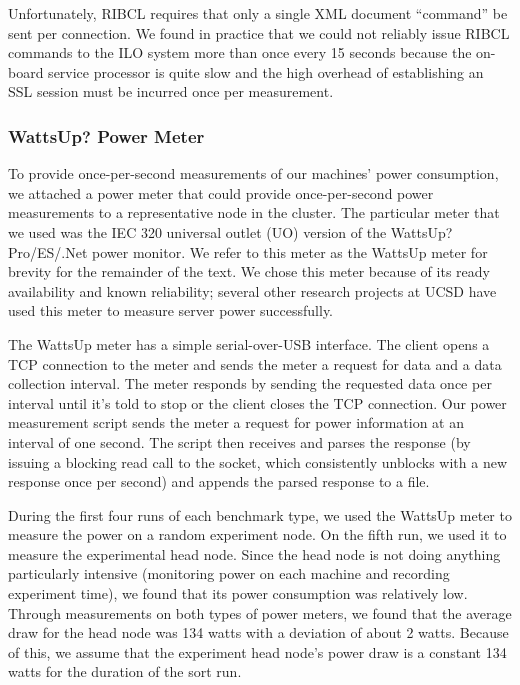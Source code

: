 Unfortunately, RIBCL requires that only a single XML document ``command'' be
sent per connection. We found in practice that we could not reliably issue
RIBCL commands to the ILO system more than once every 15 seconds because the
on-board service processor is quite slow and the high overhead of establishing
an SSL session must be incurred once per measurement.

\subsubsection{WattsUp? Power Meter}

To provide once-per-second measurements of our machines' power consumption, we
attached a power meter that could provide once-per-second power measurements to
a representative node in the cluster. The particular meter that we used was the
IEC 320 universal outlet (UO) version of the WattsUp? Pro/ES/.Net
power monitor. We refer to this meter as the WattsUp meter for brevity for the
remainder of the text. We chose this meter because of its ready availability
and known reliability; several other research projects at UCSD have used this
meter to measure server power successfully.

The WattsUp meter has a simple serial-over-USB interface. The client opens a
TCP connection to the meter and sends the meter a request for data and a data
collection interval. The meter responds by sending the requested data once per
interval until it's told to stop or the client closes the TCP connection. Our
power measurement script sends the meter a request for power information at an
interval of one second. The script then receives and parses the response (by
issuing a blocking read call to the socket, which consistently unblocks with a
new response once per second) and appends the parsed response to a file.

During the first four runs of each benchmark type, we used the WattsUp meter to
measure the power on a random experiment node. On the fifth run, we used it to
measure the experimental head node. Since the head node is not doing anything
particularly intensive (monitoring power on each machine and recording
experiment time), we found that its power consumption was relatively
low. Through measurements on both types of power meters, we found that the
average draw for the head node was 134 watts with a deviation of about 2
watts. Because of this, we assume that the experiment head node's power draw is
a constant 134 watts for the duration of the sort run.

